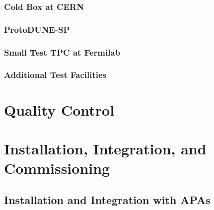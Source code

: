 \subsubsection{Cold Box at CERN}
\label{sec:fdsp-tpc-elec-qa-facilities-coldbox}


\subsubsection{ProtoDUNE-SP}
\label{sec:fdsp-tpc-elec-qa-facilities-pdune}


\subsubsection{Small Test TPC at Fermilab}
\label{sec:fdsp-tpc-elec-qa-facilities-small}


\subsubsection{Additional Test Facilities}
\label{sec:fdsp-tpc-elec-qa-facilities-other}



\section{Quality Control}
\label{sec:fdsp-tpc-elec-qc}



\section{Installation, Integration, and Commissioning}
\label{sec:fdsp-tpc-elec-install}


\subsection{Installation and Integration with APAs}
\label{sec:fdsp-tpc-elec-install-apa}


